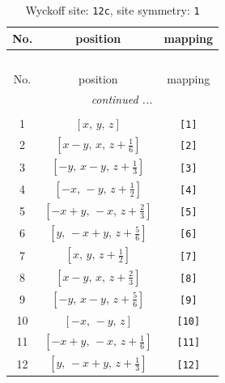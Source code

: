 \documentclass[fleqn,8pt]{jsarticle}
\begin{document}
\begin{longtable}{ccc}
\caption{Wyckoff site: {\tt 12c}, site symmetry: {\tt 1}}
 \\
 \hline \hline
No. & position & mapping \\ \hline \endfirsthead

\multicolumn{2}{l}{\tablename\ \thetable{}} \\
 \hline \hline
No. & position & mapping \\ \hline \endhead

 \hline \hline
\multicolumn{2}{r}{\footnotesize\it continued ...} \\ \endfoot

 \hline \hline
\multicolumn{2}{r}{} \\ \endlastfoot

1 & $\left[ x,\, y,\, z \right]$ & {\tt [1]} \\ \hline
2 & $\left[ x - y,\, x,\, z + \frac{1}{6} \right]$ & {\tt [2]} \\ \hline
3 & $\left[ - y,\, x - y,\, z + \frac{1}{3} \right]$ & {\tt [3]} \\ \hline
4 & $\left[ - x,\, - y,\, z + \frac{1}{2} \right]$ & {\tt [4]} \\ \hline
5 & $\left[ - x + y,\, - x,\, z + \frac{2}{3} \right]$ & {\tt [5]} \\ \hline
6 & $\left[ y,\, - x + y,\, z + \frac{5}{6} \right]$ & {\tt [6]} \\ \hline
7 & $\left[ x,\, y,\, z + \frac{1}{2} \right]$ & {\tt [7]} \\ \hline
8 & $\left[ x - y,\, x,\, z + \frac{2}{3} \right]$ & {\tt [8]} \\ \hline
9 & $\left[ - y,\, x - y,\, z + \frac{5}{6} \right]$ & {\tt [9]} \\ \hline
10 & $\left[ - x,\, - y,\, z \right]$ & {\tt [10]} \\ \hline
11 & $\left[ - x + y,\, - x,\, z + \frac{1}{6} \right]$ & {\tt [11]} \\ \hline
12 & $\left[ y,\, - x + y,\, z + \frac{1}{3} \right]$ & {\tt [12]} \\
\end{longtable}
\end{document}
